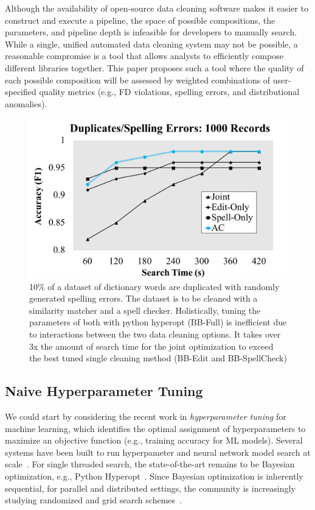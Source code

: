 Although the availability of open-source data cleaning software makes it easier to construct and execute a pipeline, the space of possible compositions, the parameters, and pipeline depth is infeasible for developers to manually search.
While a single, unified automated data cleaning system may not be possible, a reasonable compromise is a tool that allows analysts to efficiently compose different libraries together.
This paper proposes such a tool where the quality of each possible composition will be assessed by weighted combinations of user-specified quality metrics (e.g., FD violations, spelling errors, and distributional anomalies).


\begin{figure}[t]
\centering
 \includegraphics[width=0.9\columnwidth]{figures/teaser-experiment.png}
 \caption{\small 10\% of a dataset of dictionary words are duplicated with randomly generated spelling errors. The dataset is to be cleaned with a similarity matcher and a spell checker. Holistically, tuning the parameters of both with \textsf{python hyperopt} (BB-Full) is inefficient due to interactions between the two data cleaning options. It takes over 3x the amount of search time for the joint optimization to exceed the best tuned single cleaning method (BB-Edit and BB-SpellCheck) \label{fig:teaser}}
\end{figure}

\subsection{Naive Hyperparameter Tuning}
We could start by considering the recent work in \emph{hyperparameter tuning} for machine learning, which identifies the optimal assignment of hyperparameters to maximize an objective function (e.g., training accuracy for ML models).
Several systems have been built to run hyperpameter and neural network model search at scale~\cite{li2017hyperband, sparks2017keystoneml, baylor2017tfx, golovin2017google, liaw2018tune}.
For single threaded search, the state-of-the-art remains to be Bayesian optimization, e.g., Python Hyperopt~\cite{bergstra2013hyperopt}.
Since Bayesian optimization is inherently sequential, for parallel and distributed settings, the community is increasingly studying randomized and grid search schemes~\cite{li2017hyperband, liaw2018tune, golovin2017google}.
 
